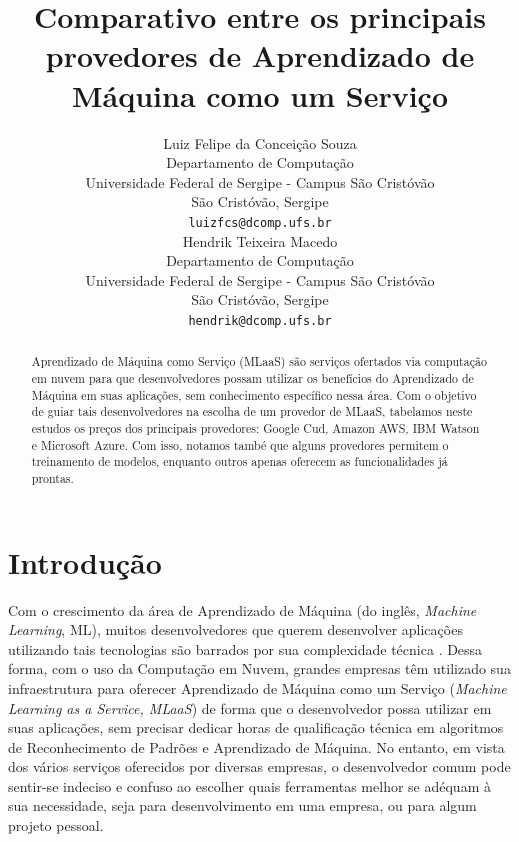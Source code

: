 \documentclass{article}
\title{Comparativo entre os principais provedores de Aprendizado de Máquina como um Serviço}
\author{
  Luiz Felipe da Conceição Souza \\
  Departamento de Computação\\
  Universidade Federal de Sergipe - Campus São Cristóvão\\
  São Cristóvão, Sergipe \\
  \texttt{luizfcs@dcomp.ufs.br} \\
   \And
 Hendrik Teixeira Macedo \\
  Departamento de Computação\\
 Universidade Federal de Sergipe - Campus São Cristóvão\\
  São Cristóvão, Sergipe \\
  \texttt{hendrik@dcomp.ufs.br} \\
}
\begin{document}
\maketitle

\begin{abstract}
Aprendizado de Máquina como Serviço (MLaaS) são serviços ofertados via computação em nuvem para que desenvolvedores possam utilizar os benefícios do Aprendizado de Máquina em suas aplicações, sem conhecimento específico nessa área. Com o objetivo de guiar tais desenvolvedores na escolha de um provedor de MLaaS, tabelamos neste estudos os preços dos principais provedores: Google Cud, Amazon AWS, IBM Watson e Microsoft Azure. Com isso, notamos també que alguns provedores permitem o treinamento de modelos, enquanto outros apenas oferecem as funcionalidades já prontas.
\end{abstract}


\section{Introdução}
Com o crescimento da área de Aprendizado de Máquina (do inglês, \textit{Machine Learning}, ML)\cite{alpaydin2014introduction}, muitos desenvolvedores que querem desenvolver aplicações utilizando tais tecnologias são barrados por sua complexidade técnica \cite{ribeiro2015}. Dessa forma, com o uso da Computação em Nuvem, grandes empresas têm utilizado sua infraestrutura para oferecer Aprendizado de Máquina como um Serviço (\textit{Machine Learning as a Service, MLaaS}) de forma que o desenvolvedor possa utilizar em suas aplicações, sem precisar dedicar horas de qualificação técnica em algoritmos de Reconhecimento de Padrões e Aprendizado de Máquina. No entanto, em vista dos vários serviços oferecidos por diversas empresas, o desenvolvedor comum pode sentir-se indeciso e confuso ao escolher quais ferramentas melhor se adéquam à sua necessidade, seja para desenvolvimento em uma empresa, ou para algum projeto pessoal.
\end{document}
